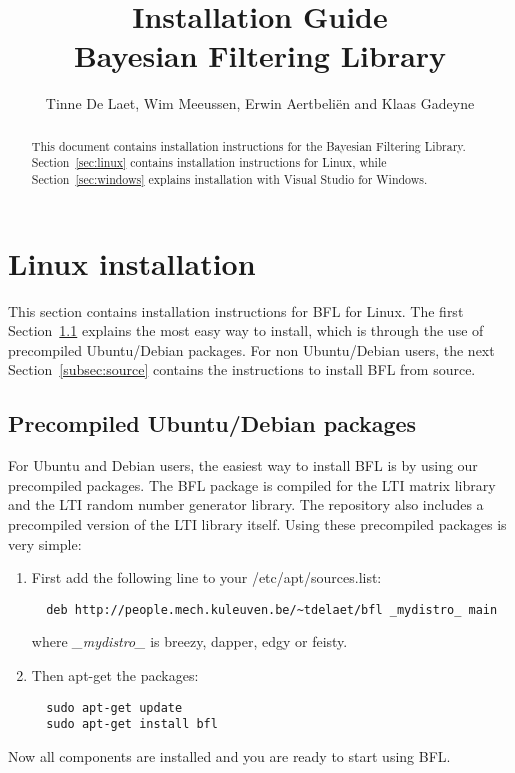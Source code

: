 \documentclass[a4paper,10pt]{article}
\title{Installation Guide \\  Bayesian Filtering Library}
\author{Tinne De Laet, Wim Meeussen, Erwin Aertbeli\"en and Klaas Gadeyne}
\begin{document}
\maketitle

\begin{abstract}
This document contains installation instructions for the Bayesian Filtering Library.
Section~\ref{sec:linux} contains installation instructions for Linux, while Section~\ref{sec:windows} explains installation with Visual Studio for Windows.
\end{abstract}


\section{Linux installation}
\label{sec:linux}
This section contains installation instructions for BFL for Linux.
The first Section~\ref{subsec:ubuntu} explains the most easy way to install, which is through the use of precompiled Ubuntu/Debian packages.
For non Ubuntu/Debian users, the next Section~\ref{subsec:source} contains the instructions to install BFL from source.

\subsection{Precompiled Ubuntu/Debian packages}
\label{subsec:ubuntu}
For Ubuntu and Debian users, the easiest way to install BFL is by
using our precompiled packages.  The BFL package is compiled for the
LTI matrix library and the LTI random number generator library.  The
repository also includes a precompiled version of the LTI library
itself.  Using these precompiled packages is very simple:
\begin{enumerate}
\item First add the following line to your /etc/apt/sources.list:
\begin{verbatim}
  deb http://people.mech.kuleuven.be/~tdelaet/bfl _mydistro_ main
\end{verbatim}
  where \emph{\_mydistro\_} is breezy, dapper, edgy or feisty.
\item Then apt-get the packages:
\begin{verbatim}
  sudo apt-get update
  sudo apt-get install bfl
\end{verbatim}
\end{enumerate}
Now all components are installed and you are ready to start using BFL.
\end{document}
